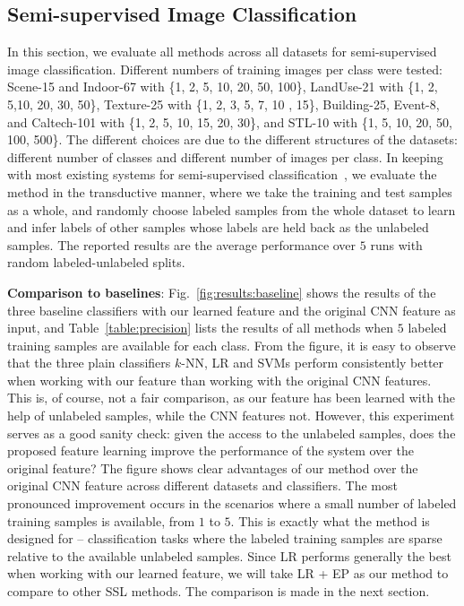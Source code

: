 \subsection{Semi-supervised Image Classification}
\label{sec:sic}
In this section, we evaluate all methods across all datasets for
semi-supervised image classification. Different numbers of training
images per class were tested: Scene-15 and Indoor-67 with \{1, 2,
5, 10, 20, 50, 100\}, LandUse-21 with \{1, 2, 5,10, 20, 30, 50\},
Texture-25 with \{1, 2, 3, 5, 7, 10 , 15\}, Building-25, Event-8,
and Caltech-101 with \{1, 2, 5, 10, 15, 20, 30\}, and STL-10
with \{1, 5, 10, 20, 50, 100, 500\}. The different choices are due
to the different structures of the datasets: different number of
classes and different number of images per class.  In keeping with
most existing systems for semi-supervised
classification~\citep{Zhu:Harmonic:03, Zhou:nips:04,
  icml10:large:graph:ssl, Fergus09, eccv10:ssl, ecml14:ssl}, we
evaluate the method in the transductive manner, where we take the
training and test samples as a whole, and randomly choose labeled
samples from the whole dataset to learn and infer labels of other
samples whose labels are held back as the unlabeled samples.  The
reported results are the average performance over $5$ runs with random
labeled-unlabeled splits.

\textbf{Comparison to baselines}: Fig.~\ref{fig:results:baseline}
shows the results of the three baseline classifiers with our learned
feature and the original CNN feature as input, and
Table~\ref{table:precision} lists the results of all methods when $5$
labeled training samples are available for each class. From the figure,
it is easy to observe that the three plain classifiers $k$-NN, LR and
SVMs perform consistently better when working with our feature than
working with the original CNN features.  This is, of course, not a fair
comparison, as our feature has been learned with the help of unlabeled
samples, while the CNN features not. However, this experiment
serves as a good sanity check: given the access to the unlabeled
samples, does the proposed feature learning improve the performance of
the system over the original feature? The figure shows clear
advantages of our method over the original CNN feature across
different datasets and classifiers. The most pronounced improvement
occurs in the scenarios where a small number of labeled training
samples is available, \eg from $1$ to $5$. This is exactly what the
method is designed for -- classification tasks where the labeled
training samples are sparse relative to the available unlabeled
samples.  Since LR performs generally the best when working with our
learned feature, we will take LR + EP as our method to compare to
other SSL methods. The comparison is made in the next section.

